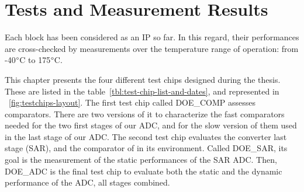 \chapter{Tests and Measurement Results}
\label{sec:tests-meas}
\ifpdf
    \graphicspath{{Chapter5/Figs/Raster/}{Chapter5/Figs/PDF/}{Chapter5/Figs/}}
\else
    \graphicspath{{Chapter5/Figs/Vector/}{Chapter5/Figs/}}
\fi 

Each block has been considered as an IP so far. In this regard, their performances are cross-checked by measurements over the temperature range of operation: from -40$\degree$C to 175$\degree$C.

This chapter presents the four different test chips designed during the thesis. These are listed in the table~\ref{tbl:test-chip-list-and-dates}, and represented in \figurename~\ref{fig:testchips-layout}. The first test chip called DOE\_COMP assesses comparators. There are two versions of it to characterize the fast comparators needed for the two first stages of our ADC, and for the slow version of them used in the last stage of our ADC. The second test chip evaluates the converter last stage (SAR), and the comparator of in its environment. Called DOE\_SAR, its goal is the measurement of the static performances of the SAR ADC\@. Then, DOE\_ADC is the final test chip to evaluate both the static and the dynamic performance of the ADC, all stages combined.


